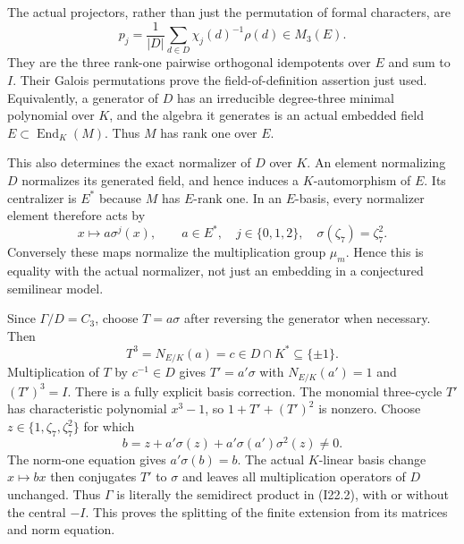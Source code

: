 The actual projectors, rather than just the permutation
of formal characters, are
\[
 p_j=\frac1{|D|}\sum_{d\in D}\chi_j(d)^{-1}\rho(d)
                   \in M_3(E).                            \tag{I22.9}
\]
They are the three rank-one pairwise orthogonal idempotents
over $E$ and sum to $I$. Their Galois permutations prove
the field-of-definition assertion just used. Equivalently,
a generator of $D$ has an irreducible degree-three minimal
polynomial over $K$, and the algebra it generates is an
actual embedded field $E\subset\operatorname{End}_K(M)$.
Thus $M$ has rank one over $E$.

This also determines the exact normalizer of $D$ over $K$.
An element normalizing $D$ normalizes its generated field,
and hence induces a $K$-automorphism of $E$. Its centralizer
is $E^*$ because $M$ has $E$-rank one. In an $E$-basis,
every normalizer element therefore acts by
\[
                   x\longmapsto a\sigma^j(x),\qquad
      a\in E^*,\quad j\in\{0,1,2\},\quad
      \sigma(\zeta_7)=\zeta_7^2.                           \tag{I22.10}
\]
Conversely these maps normalize the multiplication group
$\mu_m$. Hence this is equality with the actual normalizer,
not just an embedding in a conjectured semilinear model.

Since $\Gamma/D=C_3$, choose $T=a\sigma$ after reversing
the generator when necessary. Then
\[
              T^3=N_{E/K}(a)=c\in D\cap K^*\subseteq\{\pm1\}.
                                                               \tag{I22.11}
\]
Multiplication of $T$ by $c^{-1}\in D$ gives
$T'=a'\sigma$ with $N_{E/K}(a')=1$ and $(T')^3=I$.
There is a fully explicit basis correction. The monomial
three-cycle $T'$ has characteristic polynomial $x^3-1$,
so $1+T'+(T')^2$ is nonzero. Choose
$z\in\{1,\zeta_7,\zeta_7^2\}$ for which
\[
 b=z+a'\sigma(z)+a'\sigma(a')\sigma^2(z)\ne0.
                                                               \tag{I22.12}
\]
The norm-one equation gives $a'\sigma(b)=b$.
The actual $K$-linear basis change $x\mapsto bx$ then
conjugates $T'$ to $\sigma$ and leaves all multiplication
operators of $D$ unchanged. Thus $\Gamma$ is literally
the semidirect product in (I22.2), with or without the
central $-I$. This proves the splitting of the finite
extension from its matrices and norm equation.

